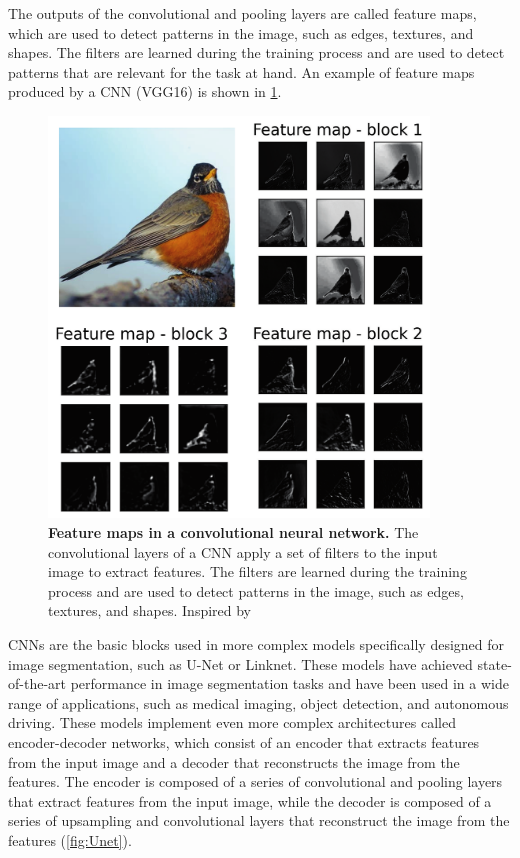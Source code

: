 The outputs of the convolutional and pooling layers are called feature maps,
which are used to detect patterns in the image, such as edges, textures, and
shapes. The filters are learned during the training process and are used to
detect patterns that are relevant for the task at hand. An example of feature
maps produced by a CNN (VGG16) is shown in \cref{fig:feature_maps}.

\begin{figure}[H]
  \centering
  \includegraphics[width=0.9\textwidth]{Figures/feature_maps.pdf}
  \caption[Feature maps in a convolutional neural network]{
    \textbf{Feature maps in a convolutional neural network.} The
    convolutional
    layers of a CNN apply a set of filters to the input image to extract
    features. The filters are learned during the training process and are
    used
    to detect patterns in the image, such as edges, textures, and shapes.
    Inspired by \cite{Brownlee2019}}
  \label{fig:feature_maps}
\end{figure}

CNNs are the basic blocks used in more complex models specifically designed
for image segmentation, such as U-Net or Linknet. These models have achieved
state-of-the-art performance in image segmentation tasks and have been used
in
a wide range of applications, such as medical imaging, object detection, and
autonomous driving. These models implement even more complex architectures
called encoder-decoder networks, which consist of an encoder that extracts
features from the input image and a decoder that reconstructs the image from
the features. The encoder is composed of a series of convolutional and
pooling
layers that extract features from the input image, while the decoder is
composed of a series of upsampling and convolutional layers that reconstruct
the image from the features (\cref{fig:Unet}).


